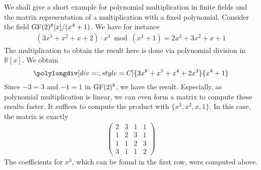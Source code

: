 \begin{example} \label{polynomial_multipl_matrix_example}
    We shall give a short example for polynomial multiplication in finite fields and the matrix representation of a multiplication with a fixed polynomial. Consider the field \(\operatorname{GF}(2)^8[x]/(x^4+1)\). We have for instance
    \begin{align}
        (3x^3+x^2+x+2) \cdot x^3 \bmod (x^4+1) = 2x^3+3x^2+x+1
    \end{align}
    The multiplication to obtain the result here is done via polynomial division in \(\mathbb{R}[x]\). We obtain
    \begin{equation}
        \polylongdiv[div=:, style=C]{3x^6+x^5+x^4+2x^3}{x^4+1}
    \end{equation}
    Since \(-3 = 3\) and \(-1 = 1\) in \(\operatorname{GF}(2)^8\), we have the result. Especially, as polynomial multiplication is linear, we can even form a matrix to compute these results faster. It suffices to compute the product with \(\{x^3, x^2, x, 1\}\). In this case, the matrix is exactly
    \begin{align}
        \begin{pmatrix}
            2 & 3 & 1 & 1\\
            1 & 2 & 3 & 1\\
            1 & 1 & 2 & 3\\
            3 & 1 & 1 & 2
        \end{pmatrix}
    \end{align}
    The coefficients for \(x^3\), which can be found in the first row, were computed above.
\end{example}
